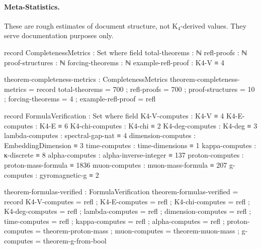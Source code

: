 \documentclass[11pt,a4paper]{book}
\begin{document}
\paragraph{Meta-Statistics.}
These are rough estimates of document structure, not K$_4$-derived values. They serve documentation purposes only.

\begin{code}
record CompletenessMetrics : Set where
  field
    total-theorems      : ℕ
    refl-proofs         : ℕ
    proof-structures    : ℕ
    forcing-theorems    : ℕ
    example-refl-proof   : K4-V ≡ 4

\end{code}

\begin{code}
theorem-completeness-metrics : CompletenessMetrics
theorem-completeness-metrics = record
  { total-theorems = 700
  ; refl-proofs = 700
  ; proof-structures = 10
  ; forcing-theorems = 4
  ; example-refl-proof = refl
  }

record FormulaVerification : Set where
  field
    K4-V-computes        : K4-V ≡ 4
    K4-E-computes        : K4-E ≡ 6
    K4-chi-computes      : K4-chi ≡ 2
    K4-deg-computes      : K4-deg ≡ 3
    lambda-computes      : spectral-gap-nat ≡ 4
    dimension-computes   : EmbeddingDimension ≡ 3
    time-computes        : time-dimensions ≡ 1
    kappa-computes       : κ-discrete ≡ 8
    alpha-computes       : alpha-inverse-integer ≡ 137
    proton-computes      : proton-mass-formula ≡ 1836
    muon-computes        : muon-mass-formula ≡ 207
    g-computes           : gyromagnetic-g ≡ 2

theorem-formulas-verified : FormulaVerification
theorem-formulas-verified = record
  { K4-V-computes = refl
  ; K4-E-computes = refl
  ; K4-chi-computes = refl
  ; K4-deg-computes = refl
  ; lambda-computes = refl
  ; dimension-computes = refl
  ; time-computes = refl
  ; kappa-computes = refl
  ; alpha-computes = refl
  ; proton-computes = theorem-proton-mass
  ; muon-computes = theorem-muon-mass
  ; g-computes = theorem-g-from-bool
  }
\end{code}
\end{document}
